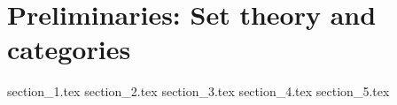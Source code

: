 \documentclass{report}
\theoremstyle{definition}
\begin{document}
	\chapter{Preliminaries: Set theory and categories}
	{section_1.tex}
	{section_2.tex}
	{section_3.tex}
	{section_4.tex}
	{section_5.tex}
		
\end{document}
